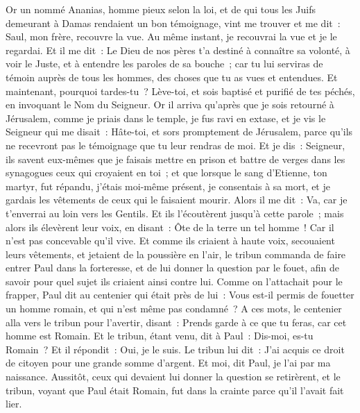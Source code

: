 \begin{multicols}{2}
Or un nommé Ananias, homme pieux selon la loi, et de qui tous les Juifs demeurant à Damas rendaient un bon témoignage, vint me trouver
et me dit~: Saul, mon frère, recouvre la vue. Au même instant, je recouvrai la vue et je le regardai.
Et il me dit~: Le Dieu de nos pères t'a destiné à connaître sa volonté, à voir le Juste, et à entendre les paroles de sa bouche~;
car tu lui serviras de témoin auprès de tous les hommes, des choses que tu as vues et entendues.
Et maintenant, pourquoi tardes-tu~? Lève-toi, et sois baptisé et purifié de tes péchés, en invoquant le Nom du Seigneur.
Or il arriva qu'après que je sois retourné à Jérusalem, comme je priais dans le temple, je fus ravi en extase,
et je vis le Seigneur qui me disait~: Hâte-toi, et sors promptement de Jérusalem, parce qu'ils ne recevront pas le témoignage que tu leur rendras de moi.
Et je dis~: Seigneur, ils savent eux-mêmes que je faisais mettre en prison et battre de verges dans les synagogues ceux qui croyaient en toi~;
et que lorsque le sang d'Etienne, ton martyr, fut répandu, j'étais moi-même présent, je consentais à sa mort, et je gardais les vêtements de ceux qui le faisaient mourir.
Alors il me dit~: Va, car je t'enverrai au loin vers les Gentils.
Et ils l'écoutèrent jusqu'à cette parole~; mais alors ils élevèrent leur voix, en disant~: Ôte de la terre un tel homme~! Car il n'est pas concevable qu'il vive.
Et comme ils criaient à haute voix, secouaient leurs vêtements, et jetaient de la poussière en l'air,
le tribun commanda de faire entrer Paul dans la forteresse, et de lui donner la question par le fouet, afin de savoir pour quel sujet ils criaient ainsi contre lui.
Comme on l'attachait pour le frapper, Paul dit au centenier qui était près de lui~: Vous est-il permis de fouetter un homme romain, et qui n'est même pas condamné~?
A ces mots, le centenier alla vers le tribun pour l'avertir, disant~: Prends garde à ce que tu feras, car cet homme est Romain.
Et le tribun, étant venu, dit à Paul~: Dis-moi, es-tu Romain~? Et il répondit~: Oui, je le suis.
Le tribun lui dit~: J'ai acquis ce droit de citoyen pour une grande somme d'argent. Et moi, dit Paul, je l'ai par ma naissance.
Aussitôt, ceux qui devaient lui donner la question se retirèrent, et le tribun, voyant que Paul était Romain, fut dans la crainte parce qu'il l'avait fait lier.

\end{multicols}
